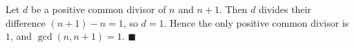Let $d$ be a positive common divisor of $n$ and $n+1$. Then $d$ divides their difference $(n+1)-n=1$, so $d=1$. Hence the only positive common divisor is $1$, and $\gcd(n,n+1)=1$. $\blacksquare$
